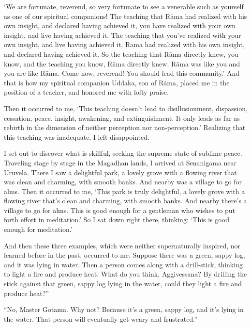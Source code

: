 \documentclass[12pt,openany]{book}%
\begin{document}
‘We are fortunate, reverend, so very fortunate to see a venerable such as yourself as one of our spiritual companions! The teaching that \textsanskrit{Rāma} had realized with his own insight, and declared having achieved it, you have realized with your own insight, and live having achieved it. The teaching that you’ve realized with your own insight, and live having achieved it, \textsanskrit{Rāma} had realized with his own insight, and declared having achieved it. So the teaching that \textsanskrit{Rāma} directly knew, you know, and the teaching you know, \textsanskrit{Rāma} directly knew. \textsanskrit{Rāma} was like you and you are like \textsanskrit{Rāma}. Come now, reverend! You should lead this community.’ And that is how my spiritual companion Uddaka, son of \textsanskrit{Rāma}, placed me in the position of a teacher, and honored me with lofty praise. 

Then it occurred to me, ‘This teaching doesn’t lead to disillusionment, dispassion, cessation, peace, insight, awakening, and extinguishment. It only leads as far as rebirth in the dimension of neither perception nor non-perception.’ Realizing that this teaching was inadequate, I left disappointed. 

I set out to discover what is skillful, seeking the supreme state of sublime peace. Traveling stage by stage in the Magadhan lands, I arrived at Senanigama near \textsanskrit{Uruvelā}. There I saw a delightful park, a lovely grove with a flowing river that was clean and charming, with smooth banks. And nearby was a village to go for alms. Then it occurred to me, ‘This park is truly delightful, a lovely grove with a flowing river that’s clean and charming, with smooth banks. And nearby there’s a village to go for alms. This is good enough for a gentleman who wishes to put forth effort in meditation.’ So I sat down right there, thinking: ‘This is good enough for meditation.’ 

And then these three examples, which were neither supernaturally inspired, nor learned before in the past, occurred to me. Suppose there was a green, sappy log, and it was lying in water. Then a person comes along with a drill-stick, thinking to light a fire and produce heat. What do you think, Aggivessana? By drilling the stick against that green, sappy log lying in the water, could they light a fire and produce heat?” 

“No, Master Gotama. Why not? Because it’s a green, sappy log, and it’s lying in the water. That person will eventually get weary and frustrated.” 
\end{document}
